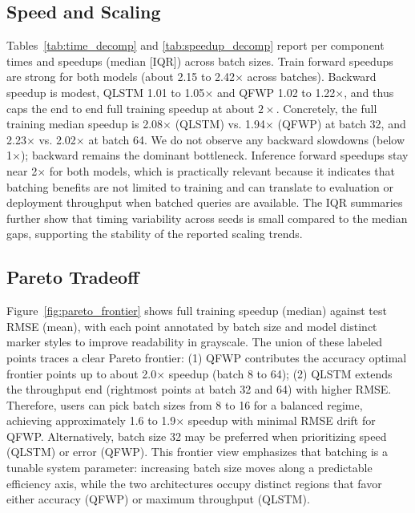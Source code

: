 \documentclass{article}
\begin{document}
\subsection{Speed and Scaling}
Tables~\ref{tab:time_decomp} and \ref{tab:speedup_decomp} report per component times and speedups (median [IQR]) across batch sizes. Train forward speedups are strong for both models (about 2.15 to 2.42$\times$ across batches). Backward speedup is modest, QLSTM 1.01 to 1.05$\times$ and QFWP 1.02 to 1.22$\times$, and thus caps the end to end full training speedup at about $2\times$. Concretely, the full training median speedup is 2.08$\times$ (QLSTM) vs. 1.94$\times$ (QFWP) at batch 32, and 2.23$\times$ vs. 2.02$\times$ at batch 64. We do not observe any backward slowdowns (below 1$\times$); backward remains the dominant bottleneck. Inference forward speedups stay near 2$\times$ for both models, which is practically relevant because it indicates that batching benefits are not limited to training and can translate to evaluation or deployment throughput when batched queries are available. The IQR summaries further show that timing variability across seeds is small compared to the median gaps, supporting the stability of the reported scaling trends.

\subsection{Pareto Tradeoff}
Figure~\ref{fig:pareto_frontier} shows full training speedup (median) against test RMSE (mean), with each point annotated by batch size and model distinct marker styles to improve readability in grayscale. The union of these labeled points traces a clear Pareto frontier:
(1) QFWP contributes the accuracy optimal frontier points up to about 2.0$\times$ speedup (batch 8 to 64); (2) QLSTM extends the throughput end (rightmost points at batch 32 and 64) with higher RMSE.
Therefore, users can pick batch sizes from 8 to 16 for a balanced regime, achieving approximately 1.6 to 1.9$\times$ speedup with minimal RMSE drift for QFWP. Alternatively, batch size 32 may be preferred when prioritizing speed (QLSTM) or error (QFWP). This frontier view emphasizes that batching is a tunable system parameter: increasing batch size moves along a predictable efficiency axis, while the two architectures occupy distinct regions that favor either accuracy (QFWP) or maximum throughput (QLSTM).
\end{document}
